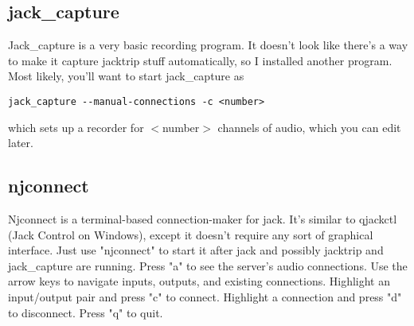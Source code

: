 \documentclass[11pt, oneside]{article}
\numberwithin{equation}{subsection}
\begin{document}
\subsection{jack\_capture}
Jack\_capture is a very basic recording program. It doesn't look like there's
a way to make it capture jacktrip stuff automatically, so I installed another
program. Most likely, you'll want to start jack\_capture as
\begin{verbatim}
jack_capture --manual-connections -c <number>
\end{verbatim}
which sets up a recorder for $<$number$>$ channels of audio, which you can edit
later.

\subsection{njconnect}
Njconnect is a terminal-based connection-maker for jack. It's similar to
qjackctl (Jack Control on Windows), except it doesn't require any sort of
graphical interface. Just use "njconnect" to start it after jack and possibly
jacktrip and jack\_capture are running. Press "a" to see the server's audio
connections. Use the arrow keys to navigate inputs, outputs, and existing
connections. Highlight an input/output pair and press "c" to connect. Highlight
a connection and press "d" to disconnect. Press "q" to quit.
\end{document}

